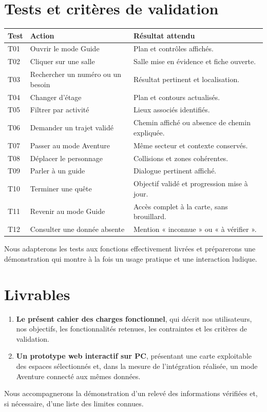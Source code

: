 \documentclass[11pt,a4paper]{article}
\begin{document}
\section{Tests et critères de validation}
\begin{longtable}{p{}p{}p{}}
\toprule Test & Action & Résultat attendu \\ \midrule
T01 & Ouvrir le mode Guide & Plan et contrôles affichés.\\
T02 & Cliquer sur une salle & Salle mise en évidence et fiche ouverte.\\
T03 & Rechercher un numéro ou un besoin & Résultat pertinent et localisation.\\
T04 & Changer d'étage & Plan et contours actualisés.\\
T05 & Filtrer par activité & Lieux associés identifiés.\\
T06 & Demander un trajet validé & Chemin affiché ou absence de chemin expliquée.\\
T07 & Passer au mode Aventure & Même secteur et contexte conservés.\\
T08 & Déplacer le personnage & Collisions et zones cohérentes.\\
T09 & Parler à un guide & Dialogue pertinent affiché.\\
T10 & Terminer une quête & Objectif validé et progression mise à jour.\\
T11 & Revenir au mode Guide & Accès complet à la carte, sans brouillard.\\
T12 & Consulter une donnée absente & Mention « inconnue » ou « à vérifier ».\\
\bottomrule
\end{longtable}
Nous adapterons les tests aux fonctions effectivement livrées et préparerons une démonstration qui montre à la fois un usage pratique et une interaction ludique.

\section{Livrables}
\begin{enumerate}
\item \textbf{Le présent cahier des charges fonctionnel}, qui décrit nos utilisateurs, nos objectifs, les fonctionnalités retenues, les contraintes et les critères de validation.
\item \textbf{Un prototype web interactif sur PC}, présentant une carte exploitable des espaces sélectionnés et, dans la mesure de l'intégration réalisée, un mode Aventure connecté aux mêmes données.
\end{enumerate}
Nous accompagnerons la démonstration d'un relevé des informations vérifiées et, si nécessaire, d'une liste des limites connues.
\end{document}
